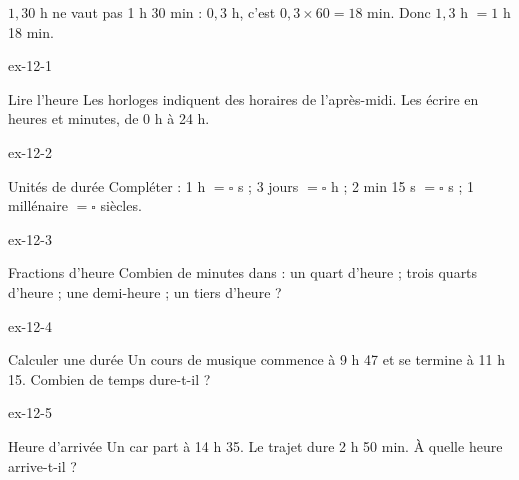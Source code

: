 \begin{attention}$1{,}30$ h ne vaut pas 1 h 30 min : $0{,}3$ h, c’est $0{,}3\times60=18$ min. Donc $1{,}3$ h $=1$ h 18 min.\end{attention}

\clearpage{}
\begin{blocLivre}{ex-12-1}\begin{exercice}[1]{Lire l’heure}
Les horloges indiquent des horaires de l’après-midi. Les écrire en heures et minutes, de 0 h à 24 h.
\label{fig-ex-12-1}
\end{exercice}\end{blocLivre}
\begin{blocLivre}{ex-12-2}\begin{exercice}[1]{Unités de durée}
Compléter : 1 h $=\square$ s ; 3 jours $=\square$ h ; 2 min 15 s $=\square$ s ; 1 millénaire $=\square$ siècles.
\end{exercice}\end{blocLivre}
\begin{blocLivre}{ex-12-3}\begin{exercice}[1]{Fractions d’heure}
Combien de minutes dans : un quart d’heure ; trois quarts d’heure ; une demi-heure ; un tiers d’heure ?
\end{exercice}\end{blocLivre}
\begin{blocLivre}{ex-12-4}\begin{exercice}[1]{Calculer une durée}
Un cours de musique commence à 9 h 47 et se termine à 11 h 15. Combien de temps dure-t-il ?
\end{exercice}\end{blocLivre}
\begin{blocLivre}{ex-12-5}\begin{exercice}[1]{Heure d’arrivée}
Un car part à 14 h 35. Le trajet dure 2 h 50 min. À quelle heure arrive-t-il ?
\end{exercice}\end{blocLivre}


